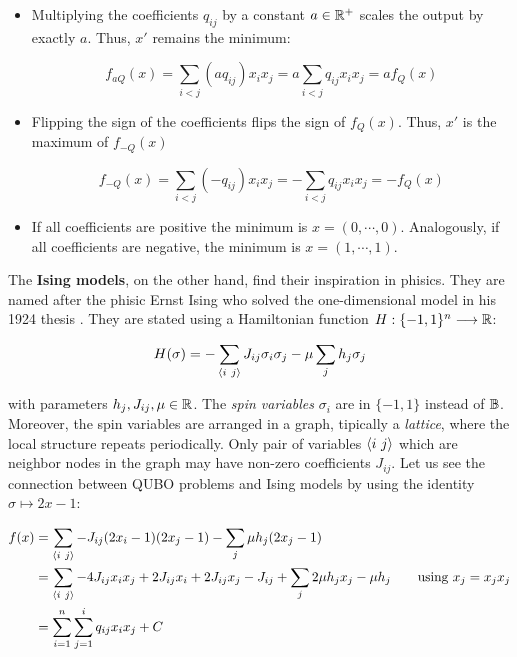 \begin{itemize}
	\item Multiplying the coefficients $q_{ij}$ by a constant $a \in \mathbb{R}^+$ scales the output by exactly $a$. Thus, $x'$ remains the minimum:
	
		$$ f_{aQ}(x) = \sum_{i<j} (a q_{ij}) x_i x_j  = a \sum_{i<j} q_{ij} x_i x_j = a f_Q(x) $$
		
	\item Flipping the sign of the coefficients flips the sign of $f_Q(x)$. Thus, $x'$ is the maximum of $f_{-Q}(x)$
	
		$$ f_{-Q}(x) = \sum_{i<j} (-q_{ij}) x_i x_j  = - \sum_{i<j} q_{ij} x_i x_j = -f_Q(x) $$
		
	\item If all coefficients are positive the minimum is $x = (0, \cdots, 0)$. Analogously, if all coefficients are negative, the minimum is $x = (1, \cdots, 1)$. 
\end{itemize}

The \textbf{Ising models}, on the other hand, find their inspiration in phisics. They are named after the phisic Ernst Ising who solved the one-dimensional model in his 1924 thesis \cite{Ising1924}. They are stated using a Hamiltonian function $H: \{-1, 1\}^n \longrightarrow \mathbb{R}$:

$$ H(\sigma) = - \sum_{\langle i ~ j \rangle} J_{ij} \sigma_i \sigma_j - \mu \sum_j h_j \sigma_j $$

with parameters $h_j, J_{ij}, \mu \in \mathbb{R}$. The \emph{spin variables} $\sigma_i$ are in $\{-1, 1\}$ instead of $\mathbb{B}$. Moreover, the spin variables are arranged in a graph, tipically a \emph{lattice}, where the local structure repeats periodically. Only pair of variables $\langle i ~ j \rangle$ which are neighbor nodes in the graph may have non-zero coefficients $J_{ij}$. Let us see the connection between QUBO problems and Ising models by using the identity $\sigma \mapsto 2x -1$:

\begin{equation*}
	\begin{split}
		f(x)	& = \sum_{\langle i ~ j \rangle} - J_{ij} (2x_i - 1) (2x_j - 1) - \sum_j \mu h_j (2x_j - 1) \\
				& = \sum_{\langle i ~ j \rangle} - 4J_{ij} x_i x_j + 2J_{ij} x_i + 2J_{ij} x_j - J_{ij} + \sum_j 2 \mu h_j x_j - \mu h_j \qquad \text{using }  x_j = x_jx_j \\
				& = \sum_{i=1}^n \sum_{j=1}^i q_{ij} x_i x_j + C
	\end{split}
\end{equation*}

